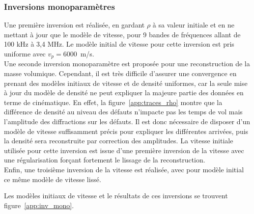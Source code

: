 
\subsubsection{Inversions monoparamètres}

Une première inversion est réalisée, en gardant $\rho$ à sa valeur initiale et en ne mettant à jour que le modèle de vitesse, pour 9 bandes de fréquences allant de 100 kHz à 3,4 MHz. Le modèle initial de vitesse pour cette inversion est pris uniforme avec $v_{p}=6000$~m/s.\\

Une seconde inversion monoparamètre est proposée pour une reconstruction de la masse volumique. Cependant, il est très difficile d'assurer une convergence en prenant des modèles initiaux de vitesse et de densité uniformes, car la seule mise à jour du modèle de densité ne peut expliquer la majeure partie des données en terme de cinématique. En effet, la figure~\ref{app:traces_rho} montre que la différence de densité au niveau des défauts n'impacte pas les temps de vol mais l'amplitude des diffractions sur les défauts. Il est donc nécessaire de disposer d'un modèle de vitesse suffisamment précis pour expliquer les différentes arrivées, puis la densité sera reconstruite par correction des amplitudes. La vitesse initiale utilisée pour cette inversion est issue d'une première inversion de la vitesse avec une régularisation forçant fortement le lissage de la reconstruction.\\

Enfin, une troisième inversion de la vitesse est réalisée, avec pour modèle initial ce même modèle de vitesse lissé.

Les modèles initiaux de vitesse et le résultats de ces inversions se trouvent figure~\ref{app:inv_mono}. 

